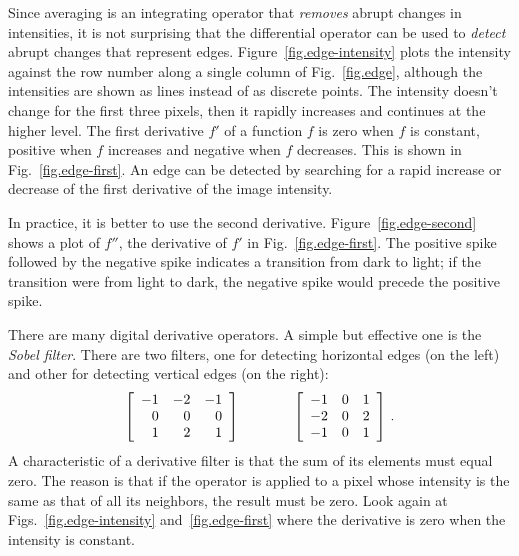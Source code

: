 Since averaging is an integrating operator that \emph{removes} abrupt changes in intensities, it is not surprising that the differential operator can be used to \emph{detect} abrupt changes that represent edges. Figure~\ref{fig.edge-intensity} plots the intensity against the row number along a single column of Fig.~\ref{fig.edge}, although the intensities are shown as lines instead of as discrete points. The intensity doesn't change for the first three pixels, then it rapidly increases and continues at the higher level. The first derivative $f'$ of a function $f$ is zero when $f$ is constant, positive when $f$ increases and negative when $f$ decreases. This is shown in Fig.~\ref{fig.edge-first}. An edge can be detected by searching for a rapid increase or decrease of the first derivative of the image intensity.

In practice, it is better to use the second derivative. Figure~\ref{fig.edge-second} shows a plot of $f''$, the derivative of $f'$ in Fig.~\ref{fig.edge-first}. The positive spike followed by the negative spike indicates a transition from dark to light; if the transition were from light to dark, the negative spike would precede the positive spike.

There are many digital derivative operators. A simple but effective one is the \emph{Sobel filter}. There are two filters, one for detecting horizontal edges (on the left) and other for detecting vertical edges (on the right):
\[
\begin{array}{c@{\hspace{4em}}c}
\left[
\begin{array}{rrr}
-1 & -2 & -1\\
0 & 0 & 0\\
1 & 2 & 1\\
\end{array}
\right]
&
\left[
\begin{array}{rrr}
-1 & 0 & 1\\
-2 & 0 & 2\\
-1 & 0 & 1\\
\end{array}
\right]\,.
\end{array}
\]
A characteristic of a derivative filter is that the sum of its elements must equal zero. The reason is that if the operator is applied to a pixel whose intensity is the same as that of all its neighbors, the result must be zero. Look again at Figs.~\ref{fig.edge-intensity} and~\ref{fig.edge-first} where the derivative is zero when the intensity is constant.

